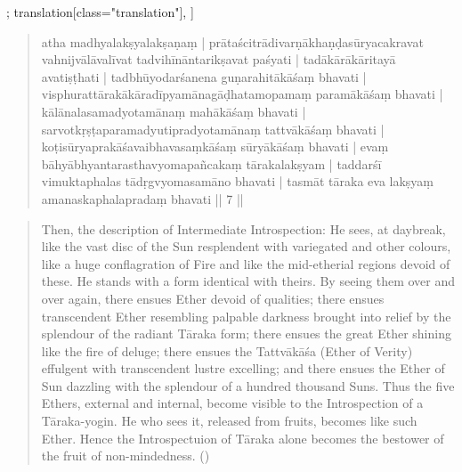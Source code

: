 \begin{alignment}[
  texts=edition[class="edition"];
  translation[class="translation"],
  ]
\begin{translation}
\begin{tlate}
{\begin{quote}
  atha madhyalakṣyalakṣaṇaṃ | prātaścitrādivarṇākhaṇḍasūryacakravat vahnijvālāvalīvat tadvihīnāntarikṣavat paśyati | tadākārākāritayā avatiṣṭhati | tadbhūyodarśanena guṇarahitākāśaṃ bhavati | visphurattārakākāradīpyamānagāḍhatamopamaṃ paramākāśaṃ bhavati | kālānalasamadyotamānaṃ mahākāśaṃ bhavati | sarvotkṛṣṭaparamadyutipradyotamānaṃ tattvākāśaṃ bhavati | koṭisūryaprakāśavaibhavasaṃkāśaṃ sūryākāśaṃ bhavati | evaṃ bāhyābhyantarasthavyomapañcakaṃ tārakalakṣyam | taddarśī vimuktaphalas tādṛgvyomasamāno bhavati | tasmāt tāraka eva lakṣyaṃ amanaskaphalapradaṃ bhavati || 7 ||
\end{quote}
\begin{quote}
 Then, the description of Intermediate Introspection: He sees, at daybreak, like the vast disc of the Sun resplendent with variegated and other colours, like a huge conflagration of Fire and like the mid-etherial regions devoid of these. He stands with a form identical with theirs. By seeing them over and over again, there ensues Ether devoid of qualities; there ensues transcendent Ether resembling palpable darkness brought into relief by the splendour of the radiant Tāraka form; there ensues the great Ether shining like the fire of deluge; there ensues the Tattvākāśa (Ether of Verity) effulgent with transcendent lustre excelling; and there ensues the Ether of Sun dazzling with the splendour of a hundred thousand Suns. Thus the five Ethers, external and internal, become visible to the Introspection of a Tāraka-yogin. He who sees it, released from fruits, becomes like such Ether. Hence the Introspectuion of Tāraka alone becomes the bestower of the fruit of non-mindedness.  
(\citeauthor[1938:4]{yogaupaniṣads})

\end{quote}}
\end{tlate}
\end{translation}
\end{alignment}
